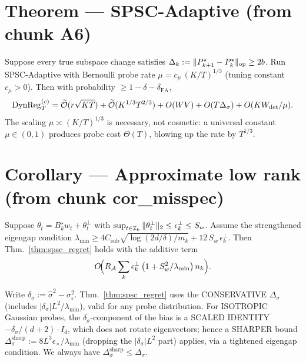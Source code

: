 \section{Theorem --- SPSC-Adaptive (from chunk A6)}

\begin{theorem}
\label{thm:spsc_adaptive}
Suppose every true subspace change satisfies $\Delta_k := \|P_{k+1}^\star - P_k^\star\|_{\mathrm{op}} \ge 2b$.
Run SPSC-Adaptive with Bernoulli probe rate $\mu = c_\mu\,(K/T)^{1/3}$
(tuning constant $c_\mu > 0$). Then with probability $\ge 1-\delta-\delta_{\mathrm{FA}}$,
\[
\mathrm{DynReg}_T^{(c)} = \widetilde{\mathcal{O}}(r\sqrt{KT}) + \widetilde{\mathcal{O}}(K^{1/3}T^{2/3}) + O(WV) + O(T\Delta_\sigma) + O(KW_{\mathrm{det}}/\mu).
\]
The scaling $\mu\asymp(K/T)^{1/3}$ is necessary, not cosmetic: a
universal constant $\mu\in(0,1)$ produces probe cost $\Theta(T)$,
blowing up the rate by $T^{1/3}$.
\end{theorem}

\section{Corollary --- Approximate low rank (from chunk cor\_misspec)}

\begin{corollary}
\label{cor:misspec}
Suppose $\theta_t = B_k^\star w_t + \theta_t^{\perp}$ with
$\sup_{t\in\mathcal{I}_k}\|\theta_t^\perp\|_2\le\epsilon_k^\perp \le S_w$.
Assume the strengthened eigengap condition
$\lambda_{\min}\ge 4 C_{\mathrm{sub}}\sqrt{\log(2d/\delta)/m_k} + 12\,S_w\,\epsilon_k^\perp$.
Then Thm.\ \ref{thm:spsc_regret} holds with the additive term
\[
O\!\Bigl(R_{\mathcal{A}}\sum_k \epsilon_k^\perp\,\bigl(1 + S_w^2/\lambda_{\min}\bigr)\, n_k\Bigr).
\]
\end{corollary}

\begin{remark}
\label{rem:variance_misspec}
Write $\delta_\sigma:=\hat\sigma^2-\sigma_\varepsilon^2$. Thm.\ \ref{thm:spsc_regret}
uses the CONSERVATIVE $\Delta_\sigma$ (includes $|\delta_\sigma|L^2/\lambda_{\min}$),
valid for any probe distribution. For ISOTROPIC Gaussian probes,
the $\delta_\sigma$-component of the bias is a SCALED IDENTITY
$-\delta_\sigma/(d+2)\cdot I_d$, which does not rotate eigenvectors;
hence a SHARPER bound
$\Delta_\sigma^{\mathrm{sharp}}:=8L^3\epsilon_\times/\lambda_{\min}$
(dropping the $|\delta_\sigma|L^2$ part) applies, via a tightened
eigengap condition. We always have $\Delta_\sigma^{\mathrm{sharp}} \le \Delta_\sigma$.
\end{remark}

